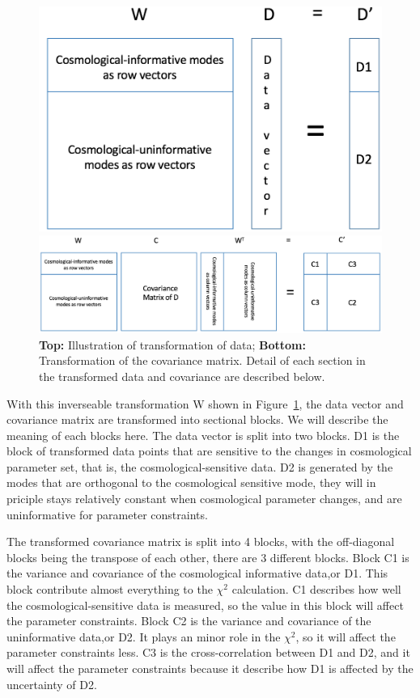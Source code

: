 \documentclass[twocolumn]{\docclass}
\newcommand{\rf}[1]{\ref{fig:#1}}
\begin{document}
\begin{figure}[]
	\includegraphics[width=0.45\columnwidth]{data_transformation.png}
	
	 \bigskip
	 
	\includegraphics[width=0.99\columnwidth]{CM_transformation.png}
	\caption{\textbf{Top:} Illustration of transformation of data; \textbf{Bottom:} Transformation of the covariance matrix. Detail of each section in the transformed data and covariance are described below. \label{fig:illu-trans}}
\end{figure}

With this inverseable transformation W shown in Figure~\rf{illu-trans}, the data vector and covariance matrix are transformed into sectional blocks. We will describe the meaning of each blocks here. The data vector is split into two blocks. D1 is the block of transformed data points that are sensitive to the changes in cosmological parameter set, that is, the cosmological-sensitive data. D2 is generated by the modes that are orthogonal to the cosmological sensitive mode, they will in priciple stays relatively constant when cosmological parameter changes, and are uninformative for parameter constraints.

The transformed covariance matrix is split into 4 blocks, with the off-diagonal blocks being the transpose of each other, there are 3 different blocks. Block C1 is the variance and covariance of the cosmological informative data,or D1. This block contribute almost everything to the $\chi^2$ calculation. C1 describes how well the cosmological-sensitive data is measured, so the value in this block will affect the parameter constraints. Block C2 is the variance and covariance of the uninformative data,or D2. It plays an minor role in the $\chi^2$, so it will affect the parameter constraints less. C3 is the cross-correlation between D1 and D2, and it will affect the parameter constraints because it describe how D1 is affected by the uncertainty of D2.
\end{document}
